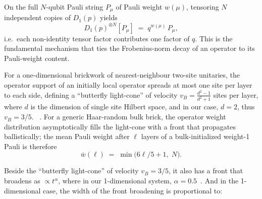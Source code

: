 \documentclass[%
 reprint,
superscriptaddress,
 amsmath,amssymb,
 aps,
]{revtex4-2}
\begin{document}
On the full $N$-qubit Pauli string $P_\mu$ of Pauli weight $w(\mu)$, tensoring $N$ independent copies of $D_1(p)$ yields
\begin{equation}
    D_1(p)^{\otimes N}[P_\mu] \;=\; q^{w(\mu)}\,P_\mu,
    \label{eq:D1_on_Pauli}
\end{equation}
i.e.\ each non-identity tensor factor contributes one factor of $q$. This is the fundamental mechanism that ties the Frobenius-norm decay of an operator to its Pauli-weight content.

For a one-dimensional brickwork of nearest-neighbour two-site unitaries, the operator support of an initially local operator spreads at most one site per layer to each side, defining a ``butterfly light-cone'' of velocity $v_B=\frac{d^2-1}{d^2+1}$ sites per layer, where $d$ is the dimension of single site Hilbert space, and in our case, $d=2$, thus $v_B=3/5$. ~\cite{nahum2018operator,vonKeyserlingk2018operatorhydrodynamics,chen2018operator}. For a generic Haar-random bulk brick, the operator weight distribution asymptotically fills the light-cone with a front that propagates ballistically; the mean Pauli weight after $\ell$ layers of a bulk-initialized weight-1 Pauli is therefore
\begin{equation}
    \bar w(\ell) \;=\; \min\!\bigl(6\ell/5+1,\;N\bigr).
    \label{eq:mean_weight_lightcone}
\end{equation}

Beside the ``butterfly light-cone'' of velocity $v_B=3/5$, it also has a front that broadens as $\propto t^\alpha$, where in our 1-dimensional system, $\alpha = 0.5$~\cite{nahum2018operator}. And in the 1-dimensional case, the width of the front broadening is proportional to:
\end{document}
